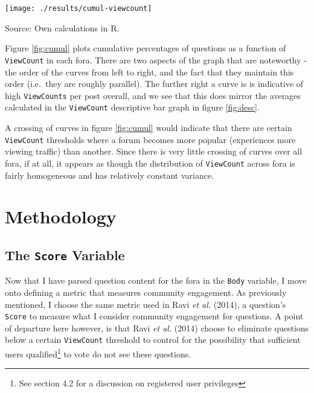 \documentclass[12pt,preprint, authoryear]{article}
\let\origfigure\figure
\let\endorigfigure\endfigure
\renewenvironment{figure}[1][2] {
    \expandafter\origfigure\expandafter[H]
} {
    \endorigfigure
}
\numberwithin{equation}{section}
\numberwithin{figure}{section}
\numberwithin{table}{section}
\let\rmarkdownfootnote\footnote%
\def\footnote{\protect\rmarkdownfootnote}
\begin{document}
\begin{figure}
\caption{\textbf{Cumulative Graph for Question Viewcounts}}
\label{fig:cumul}

\begin{center}\texttt{[image: ./results/cumul-viewcount]} \end{center}
\centering
{\footnotesize Source: Own calculations in R.}
\end{figure}

\normalsize

Figure \ref{fig:cumul} plots cumulative percentages of questions as a
function of \texttt{ViewCount} in each fora. There are two aspects of
the graph that are noteworthy - the order of the curves from left to
right, and the fact that they maintain this order (i.e.~they are roughly
parallel). The further right a curve is is indicative of high
\texttt{ViewCounts} per post overall, and we see that this does mirror
the averages calculated in the \texttt{ViewCount} descriptive bar graph
in figure \ref{fig:desc}.

A crossing of curves in figure \ref{fig:cumul} would indicate that there
are certain \texttt{ViewCount} thresholds where a forum becomes more
popular (experiences more viewing traffic) than another. Since there is
very little crossing of curves over all fora, if at all, it appears as
though the distribution of \texttt{ViewCount} across fora is fairly
homogeneous and has relatively constant variance.

\section{Methodology}\label{methodology}

\subsection{\texorpdfstring{The \texttt{Score}
Variable}{The Score Variable}}\label{the-score-variable}

Now that I have parsed question content for the fora in the
\texttt{Body} variable, I move onto defining a metric that measures
community engagement. As previously mentioned, I choose the same metric
used in Ravi \emph{et al.} (2014), a question's \texttt{Score} to
measure what I consider community engagement for questions. A point of
departure here however, is that Ravi \emph{et al.} (2014) choose to
eliminate questions below a certain \texttt{ViewCount} threshold to
control for the possibility that sufficient users
qualified\footnote{See section 4.2 for a discussion on registered user privileges}
to vote do not see these questions.
\end{document}
